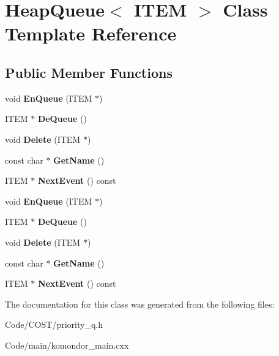\hypertarget{classHeapQueue}{}\section{Heap\+Queue$<$ I\+T\+EM $>$ Class Template Reference}
\label{classHeapQueue}
\subsection*{Public Member Functions}
\begin{DoxyCompactItemize}
\item 
\mbox{\label{classHeapQueue_a34b120300e81e7e27c995f745e241e69}} 
void {\bfseries En\+Queue} (I\+T\+EM $\ast$)
\item 
\mbox{\label{classHeapQueue_a2b87b3b608e4b4f4d9fed25033ebb4e9}} 
I\+T\+EM $\ast$ {\bfseries De\+Queue} ()
\item 
\mbox{\label{classHeapQueue_a1a62b5af268621bce07d8d73bffa6833}} 
void {\bfseries Delete} (I\+T\+EM $\ast$)
\item 
\mbox{\label{classHeapQueue_a20ca495fa32157a104db74f5051ecf36}} 
const char $\ast$ {\bfseries Get\+Name} ()
\item 
\mbox{\label{classHeapQueue_a6951aa5e33a02c93332cc205edab6544}} 
I\+T\+EM $\ast$ {\bfseries Next\+Event} () const
\item 
\mbox{\label{classHeapQueue_a34b120300e81e7e27c995f745e241e69}} 
void {\bfseries En\+Queue} (I\+T\+EM $\ast$)
\item 
\mbox{\label{classHeapQueue_a5610387a0a3103d291630254750f7acd}} 
I\+T\+EM $\ast$ {\bfseries De\+Queue} ()
\item 
\mbox{\label{classHeapQueue_a1a62b5af268621bce07d8d73bffa6833}} 
void {\bfseries Delete} (I\+T\+EM $\ast$)
\item 
\mbox{\label{classHeapQueue_ab832331b8f0d69021cff057ab116abb7}} 
const char $\ast$ {\bfseries Get\+Name} ()
\item 
\mbox{\label{classHeapQueue_a6951aa5e33a02c93332cc205edab6544}} 
I\+T\+EM $\ast$ {\bfseries Next\+Event} () const
\end{DoxyCompactItemize}


The documentation for this class was generated from the following files\+:\begin{DoxyCompactItemize}
\item 
Code/\+C\+O\+S\+T/priority\+\_\+q.\+h\item 
Code/main/komondor\+\_\+main.\+cxx\end{DoxyCompactItemize}
